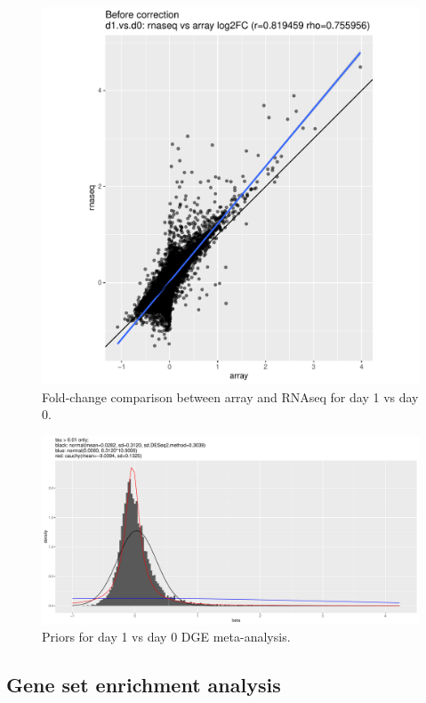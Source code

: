 \begin{figure}
    \includegraphics[width=1.0\textwidth]{./mainmatter/figures/chapter_02/meta.rnaseqVsArray.log2FC.beforeBiasCorrection.coefName_d1.vs.d0.pdf}
    \caption{Fold-change comparison between array and RNAseq for day 1 vs day 0.}
\end{figure}

\begin{figure}
    \includegraphics[width=1.0\textwidth]{./mainmatter/figures/chapter_02/meta.bayesmeta.priors.coefName_d1.vs.d0.pdf}
    \caption{Priors for day 1 vs day 0 DGE meta-analysis.}
\end{figure}

\subsection{Gene set enrichment analysis}

